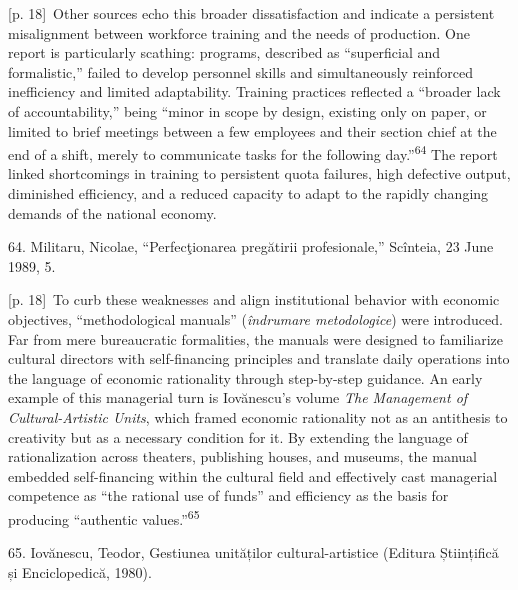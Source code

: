 \documentclass[10pt,a4paper]{article}
\begin{document}
{\scriptsize\color{gray} [p. 18]}\ Other sources echo this broader dissatisfaction and indicate a persistent misalignment between workforce training and the needs of production. One report is particularly scathing: programs, described as “superficial and formalistic,” failed to develop personnel skills and simultaneously reinforced inefficiency and limited adaptability. Training practices reflected a “broader lack of accountability,” being “minor in scope by design, existing only on paper, or limited to brief meetings between a few employees and their section chief at the end of a shift, merely to communicate tasks for the following day.”\nobreak\textsuperscript{64} The report linked shortcomings in training to persistent quota failures, high defective output, diminished efficiency, and a reduced capacity to adapt to the rapidly changing demands of the national economy.\par{\small 64. Militaru, Nicolae, “Perfecţionarea pregătirii profesionale,” Scînteia, 23 June 1989, 5.\par}
{\scriptsize\color{gray} [p. 18]}\ To curb these weaknesses and align institutional behavior with economic objectives, “methodological manuals” (\textit{îndrumare metodologice}) were introduced. Far from mere bureaucratic formalities, the manuals were designed to familiarize cultural directors with self-financing principles and translate daily operations into the language of economic rationality through step-by-step guidance. An early example of this managerial turn is Iovănescu’s volume \textit{The Management of Cultural-Artistic Units}, which framed economic rationality not as an antithesis to creativity but as a necessary condition for it. By extending the language of rationalization across theaters, publishing houses, and museums, the manual embedded self-financing within the cultural field and effectively cast managerial competence as “the rational use of funds” and efficiency as the basis for producing “authentic values.”\nobreak\textsuperscript{65}\par{\small 65. Iovănescu, Teodor, Gestiunea unităților cultural-artistice (Editura Științifică și Enciclopedică, 1980).\par}
\end{document}
